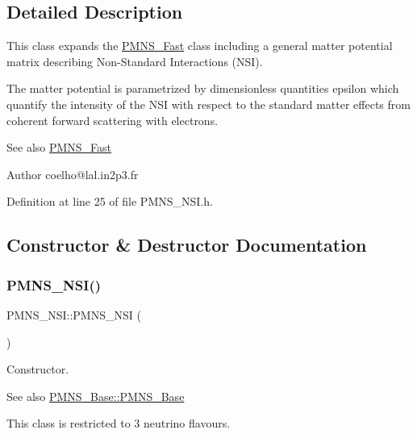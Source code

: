 \subsection{Detailed Description}
This class expands the \hyperlink{classOscProb_1_1PMNS__Fast}{P\+M\+N\+S\+\_\+\+Fast} class including a general matter potential matrix describing Non-\/\+Standard Interactions (N\+SI).

The matter potential is parametrized by dimensionless quantities epsilon which quantify the intensity of the N\+SI with respect to the standard matter effects from coherent forward scattering with electrons.

\begin{DoxySeeAlso}{See also}
\hyperlink{classOscProb_1_1PMNS__Fast}{P\+M\+N\+S\+\_\+\+Fast}
\end{DoxySeeAlso}
\begin{DoxyAuthor}{Author}
coelho@lal.\+in2p3.\+fr 
\end{DoxyAuthor}


Definition at line 25 of file P\+M\+N\+S\+\_\+\+N\+S\+I.\+h.



\subsection{Constructor \& Destructor Documentation}
\mbox{\label{classOscProb_1_1PMNS__NSI_ab41e79fb427c7a5662443acad31ce7e9}} 
\subsubsection{\texorpdfstring{P\+M\+N\+S\+\_\+\+N\+S\+I()}{PMNS\_NSI()}}
{\footnotesize\ttfamily P\+M\+N\+S\+\_\+\+N\+S\+I\+::\+P\+M\+N\+S\+\_\+\+N\+SI (\begin{DoxyParamCaption}{ }\end{DoxyParamCaption})}

Constructor. \begin{DoxySeeAlso}{See also}
\hyperlink{classOscProb_1_1PMNS__Base_aa53e83b03a9cf4bdfa0a07136bd17a79}{P\+M\+N\+S\+\_\+\+Base\+::\+P\+M\+N\+S\+\_\+\+Base}
\end{DoxySeeAlso}
This class is restricted to 3 neutrino flavours. 


